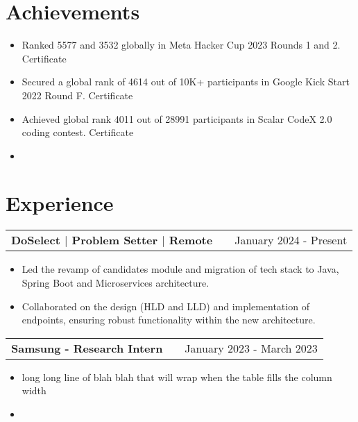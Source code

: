 \documentclass[a4paper,10pt]{article}
\makeatletter
\newenvironment{joblong}[2]
    {
    \begin{tabularx}{\linewidth}{@{}l X r@{}}
    \textbf{#1} & \hfill &  #2 \\[3.75pt]
    \end{tabularx}
    \begin{minipage}[t]{\linewidth}
    \begin{itemize}[nosep,after=\strut, leftmargin=1em, itemsep=2pt,label=--]
    }
    {
    \end{itemize}
    \end{minipage}    
    }
\makeatother
\begin{document}





\section{Achievements}
\vspace{-5pt}
\begin{itemize}
    \setlength\itemsep{-3pt} 
    \item Ranked 5577 and 3532 globally in Meta Hacker Cup 2023 Rounds 1 and 2. Certificate
    \item Secured a global rank of 4614 out of 10K+ participants in Google Kick Start 2022 Round F. Certificate
    \item Achieved global rank 4011 out of 28991 participants in Scalar CodeX 2.0 coding contest. Certificate
    \item 
\end{itemize}


\section{Experience}
\vspace{-5pt}
\begin{joblong}{DoSelect $|$ Problem Setter $|$ Remote}{January 2024 - Present}
\item Led the revamp of candidates module and migration of tech stack to Java, Spring Boot and Microservices architecture.
\item Collaborated on the design (HLD and LLD) and implementation of endpoints, ensuring robust functionality within the
new architecture.
\end{joblong}

\begin{joblong}{Samsung - Research Intern}{January 2023 - March 2023}
\item long long line of blah blah that will wrap when the table fills the column width
\item 
\end{joblong}
\end{document}
